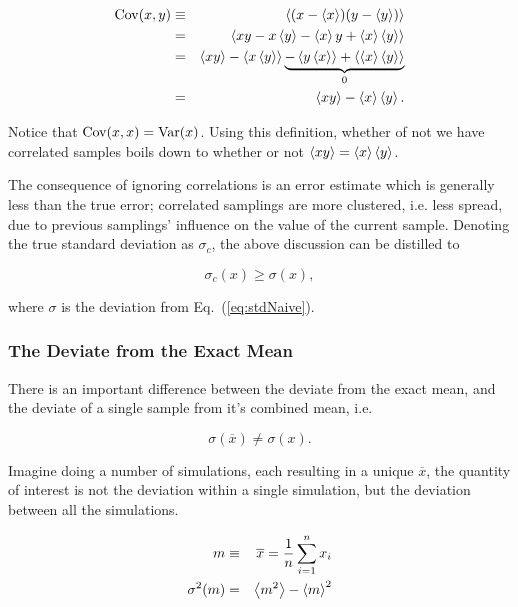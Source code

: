 \begin{eqnarray}
\label{eq:covariance}
 \mathrm{Cov}(x, y) &\equiv& \left< (x - \left< x \right>)(y - \left< y \right>) \right> \nonumber\\
            &=& \left< xy - x\left< y \right> - \left< x \right>y + \left< x \right>\left< y \right> \right> \nonumber\\
            &=& \left< xy \right> - \left< x\left< y \right> \right> \underbrace{-\left< y\left< x \right> \right> + \left< \left< x \right>\left< y \right> \right>}_{0} \nonumber\\
            &=& \left< xy \right> - \left< x \right>\left< y \right>.
\end{eqnarray}

Notice that $\mathrm{Cov}(x,x) = \mathrm{Var}(x)$. Using this definition, whether of not we have correlated samples boils down to whether or not $\left< xy \right> = \left< x \right>\left< y \right>$. 

The consequence of ignoring correlations is an error estimate which is generally less than the true error; correlated samplings are more clustered, i.e. less spread, due to previous samplings' influence on the value of the current sample. Denoting the true standard deviation as $\sigma_c$, the above discussion can be distilled to

\begin{equation}
 \label{eq:trueVsNaiveSTD}
 \sigma_c(x) \ge \sigma(x),
\end{equation}

where $\sigma$ is the deviation from Eq.~(\ref{eq:stdNaive}). 


\subsubsection{The Deviate from the Exact Mean}

There is an important difference between the deviate from the exact mean, and the deviate of a single sample from it's combined mean, i.e.

\begin{equation}
 \sigma(\overline{x}) \ne \sigma(x).
\end{equation}

Imagine doing a number of simulations, each resulting in a unique $\overline{x}$, the quantity of interest is not the deviation within a single simulation, but the deviation between all the simulations.

\begin{eqnarray}
 m &\equiv& \overline{x} = \frac{1}{n}\sum_{i=1}^n x_i \\
 \sigma^2(m) &=& \left< m^2 \right> - \left< m \right>^2
\end{eqnarray}

